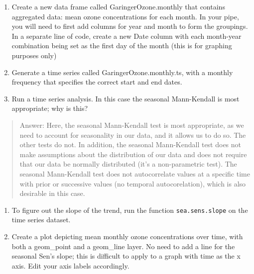\documentclass[
]{article}
\begin{document}
\begin{enumerate}
\def\labelenumi{\arabic{enumi}.}
\setcounter{enumi}{8}
\item
  Create a new data frame called GaringerOzone.monthly that contains
  aggregated data: mean ozone concentrations for each month. In your
  pipe, you will need to first add columns for year and month to form
  the groupings. In a separate line of code, create a new Date column
  with each month-year combination being set as the first day of the
  month (this is for graphing purposes only)
\item
  Generate a time series called GaringerOzone.monthly.ts, with a monthly
  frequency that specifies the correct start and end dates.
\item
  Run a time series analysis. In this case the seasonal Mann-Kendall is
  most appropriate; why is this?
\end{enumerate}

\begin{quote}
Answer: Here, the seasonal Mann-Kendall test is most appropriate, as we
need to account for seasonality in our data, and it allows us to do so.
The other tests do not. In addition, the seasonal Mann-Kendall test does
not make assumptions about the distribution of our data and does not
require that our data be normally distributed (it's a non-parametric
test). The seasonal Mann-Kendall test does not autocorrelate values at a
specific time with prior or successive values (no temporal
autocorelation), which is also desirable in this case.
\end{quote}

\begin{enumerate}
\def\labelenumi{\arabic{enumi}.}
\setcounter{enumi}{11}
\item
  To figure out the slope of the trend, run the function
  \texttt{sea.sens.slope} on the time series dataset.
\item
  Create a plot depicting mean monthly ozone concentrations over time,
  with both a geom\_point and a geom\_line layer. No need to add a line
  for the seasonal Sen's slope; this is difficult to apply to a graph
  with time as the x axis. Edit your axis labels accordingly.
\end{enumerate}
\end{document}
